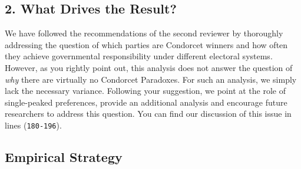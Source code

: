 \documentclass[a4paper, 12pt]{scrartcl}
\begin{document}
\subsection*{2. What Drives the Result?}
We have followed the recommendations of the second reviewer by thoroughly addressing the question of which parties are Condorcet winners and how often they achieve governmental responsibility under different electoral systems. However, as you rightly point out, this analysis does not answer the question of \textit{why} there are virtually no Condorcet Paradoxes. For such an analysis, we simply lack the necessary variance. Following your suggestion, we point at the role of single-peaked preferences, provide an additional analysis and encourage future researchers to address this question. You can find our discussion of this issue in lines (\texttt{180-196}).

\subsection*{Empirical Strategy}
\end{document}
